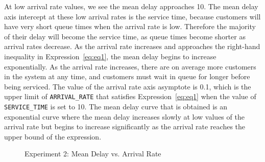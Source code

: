 At low arrival rate values, we see the mean delay approaches 10. The mean delay axis intercept at these low arrival rates is the service time, because customers will have very short queue times when the arrival rate is low. Therefore the majority of their delay will become the service time, as queue times become shorter as arrival rates decrease.
As the arrival rate increases and approaches the right-hand inequality in Expression~\ref{eq:eq1}, the mean delay begins to increase exponentially. As the arrival rate increases, there are on average more customers in the system at any time, and customers must wait in queue for longer before being serviced. The value of the arrival rate axis asymptote is 0.1, which is the upper limit of \texttt{ARRIVAL\_RATE} that satisfies Expression~\ref{eq:eq1} when the value of \texttt{SERVICE\_TIME} is set to 10.
The mean delay curve that is obtained is an exponential curve where the mean delay increases slowly at low values of the arrival rate but begins to increase significantly as the arrival rate reaches the upper bound of the expression.

\begin{figure}[h]
\centering
{}
\caption{Experiment 2: Mean Delay vs. Arrival Rate}
\label{fig:exp2}
\end{figure}